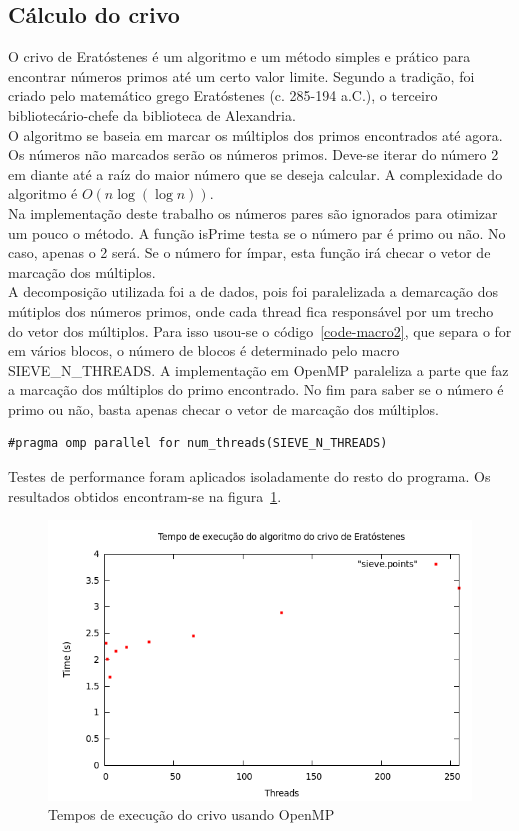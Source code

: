 \documentclass[a4paper]{article}
\begin{document}
\subsection{Cálculo do crivo}
\indent \indent O crivo de Eratóstenes é um algoritmo e um método simples e prático para encontrar números primos até um certo valor limite. Segundo a tradição, foi criado pelo matemático grego Eratóstenes (c. 285-194 a.C.), o terceiro bibliotecário-chefe da biblioteca de Alexandria.\\
\indent O algoritmo se baseia em marcar os múltiplos dos primos encontrados até agora. Os números não marcados serão os números primos. Deve-se iterar do número 2 em diante até a raíz do maior número que se deseja calcular. A complexidade do algoritmo é \begin{math}O(n\log(\log n))\end{math}.\\
\indent Na implementação deste trabalho os números pares são ignorados para otimizar um pouco o método. A função isPrime testa se o número par é primo ou não. No caso, apenas o 2 será. Se o número for ímpar, esta função irá checar o vetor de marcação dos múltiplos.\\
\indent A decomposição utilizada foi a de dados, pois foi paralelizada a demarcação dos mútiplos dos números primos, onde cada thread fica responsável por um trecho do vetor dos múltiplos. Para isso usou-se o código~\ref{code-macro2}, que separa o for em vários blocos, o número de blocos é determinado pelo macro SIEVE\_N\_THREADS. A implementação em OpenMP paraleliza a parte que faz a marcação dos múltiplos do primo encontrado. No fim para saber se o número é primo ou não, basta apenas checar o vetor de marcação dos múltiplos.
\begin{lstlisting}[caption=Macro que paraleliza o algoritmo do palíndromo, label=code-macro2]
#pragma omp parallel for num_threads(SIEVE_N_THREADS)
\end{lstlisting}
\indent \indent Testes de performance foram aplicados isoladamente do resto do programa. Os resultados obtidos encontram-se na figura~\ref{graph-sieve-omp}.
\begin{figure}[float=p]
	\includegraphics[scale=0.5]{graph-sieve-omp}
	\caption{Tempos de execução do crivo usando OpenMP}
	\label{graph-sieve-omp}
\end{figure}
\end{document}

